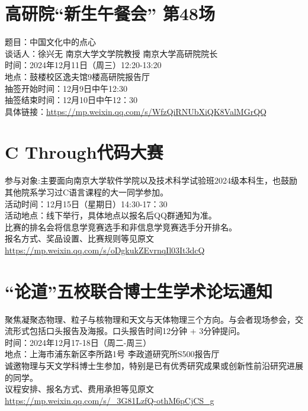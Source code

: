\documentclass[letterpaper, 12pt]{article}
\begin{document}
\begin{multicols}{2}
\section{高研院“新生午餐会” 第48场}
题目：中国文化中的点心\\
谈话人：徐兴无 南京大学文学院教授 南京大学高研院院长\\
时间：2024年12月11日（周三）12:20-13:20\\
地点：鼓楼校区逸夫馆9楼高研院报告厅\\
抽签开始时间：12月9日中午12:30\\
抽签结束时间：12月10日中午12：30\\
具体链接：\url{https://mp.weixin.qq.com/s/WfzQiRNUbXiQK8ValMGrQQ}

\section{C Through代码大赛}
参与对象:主要面向南京大学软件学院以及技术科学试验班2024级本科生，也鼓励其他院系学习过C语言课程的大一同学参加。\\
活动时间：12月15日（星期日）14:30-17：30\\
活动地点：线下举行，具体地点以报名后QQ群通知为准。\\
比赛的排名会将信息学竞赛选手和非信息学竞赛选手分开排名。\\
报名方式、奖品设置、比赛规则等见原文\url{https://mp.weixin.qq.com/s/oDgkukZEvrnqIl03It3dcQ}

\section{“论道”五校联合博士生学术论坛通知}
聚焦凝聚态物理、粒子与核物理和天文与天体物理三个方向。与会者现场参会，交流形式包括口头报告及海报。口头报告时间12分钟 + 3分钟提问。\\
时间：2024年12月17-18日（周二-周三）\\
地点：上海市浦东新区李所路1号 李政道研究所S500报告厅\\
诚邀物理与天文学科博士生参加，特别是已有优秀研究成果或创新性前沿研究进展的同学。\\
议程安排、报名方式、费用承担等见原文\url{https://mp.weixin.qq.com/s/_3G81LzfQ-othM6pCjCS_g}


\end{multicols}
\end{document}
